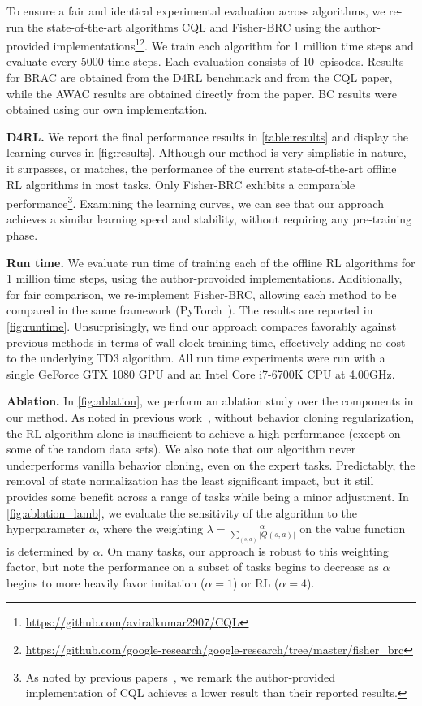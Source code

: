 \documentclass{article}
\newcommand{\al}{\alpha}
\begin{document}
To ensure a fair and identical experimental evaluation across algorithms, we re-run the state-of-the-art algorithms CQL and Fisher-BRC using the author-provided 
implementations\footnote{\url{https://github.com/aviralkumar2907/CQL}}\footnote{\url{https://github.com/google-research/google-research/tree/master/fisher_brc}}. We train each algorithm for 1 million time steps and evaluate every 5000 time steps. Each evaluation consists of 10~episodes. Results for BRAC are obtained from the D4RL benchmark and from the CQL paper, while the AWAC results are obtained directly from the paper. BC results were obtained using our own implementation. 

\textbf{D4RL.} We report the final performance results in \autoref{table:results} and display the learning curves in \autoref{fig:results}. Although our method is very simplistic in nature, it surpasses, or matches, the performance of the current state-of-the-art offline RL algorithms in most tasks. Only Fisher-BRC exhibits a comparable performance\footnote{As noted by previous papers~\citep{kostrikov2021offline}, we remark the author-provided implementation of CQL achieves a lower result than their reported results.}. Examining the learning curves, we can see that our approach achieves a similar learning speed and stability, without requiring any pre-training phase. 

\textbf{Run time.} We evaluate run time of training each of the offline RL algorithms for 1 million time steps, using the author-provoided implementations. Additionally, for fair comparison, we re-implement Fisher-BRC, allowing each method to be compared in the same framework (PyTorch~\citep{paszke2019pytorch}). The results are reported in \autoref{fig:runtime}. Unsurprisingly, we find our approach compares favorably against previous methods in terms of wall-clock training time, effectively adding no cost to the underlying TD3 algorithm. All run time experiments were run with a single GeForce GTX 1080 GPU and an Intel Core i7-6700K CPU at 4.00GHz.

\textbf{Ablation.} 
In \autoref{fig:ablation}, we perform an ablation study over the components in our method. 
As noted in previous work~\citep{fujimoto2018off}, without behavior cloning regularization, the RL algorithm alone is insufficient to achieve a high performance (except on some of the random data sets). We also note that our algorithm never underperforms vanilla behavior cloning, even on the expert tasks. Predictably, the removal of state normalization has the least significant impact, but it still provides some benefit across a range of tasks while being a minor adjustment. In \autoref{fig:ablation_lamb}, we evaluate the sensitivity of the algorithm to the hyperparameter $\al$, where the weighting $\lambda=\frac{\al}{\sum_{(s,a)} |Q(s,a)|}$ on the value function is determined by $\al$. On many tasks, our approach is robust to this weighting factor, but note the performance on a subset of tasks begins to decrease as $\al$ begins to more heavily favor imitation ($\al=1$) or RL ($\al=4$). 
\end{document}
